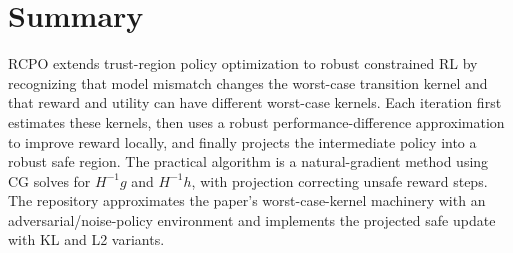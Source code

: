 \documentclass[11pt]{article}
\begin{document}
\section{Summary}
RCPO extends trust-region policy optimization to robust constrained RL by recognizing that model mismatch changes the worst-case transition kernel and that reward and utility can have different worst-case kernels.  Each iteration first estimates these kernels, then uses a robust performance-difference approximation to improve reward locally, and finally projects the intermediate policy into a robust safe region.  The practical algorithm is a natural-gradient method using CG solves for $H^{-1}g$ and $H^{-1}h$, with projection correcting unsafe reward steps.  The repository approximates the paper's worst-case-kernel machinery with an adversarial/noise-policy environment and implements the projected safe update with KL and L2 variants.
\end{document}
